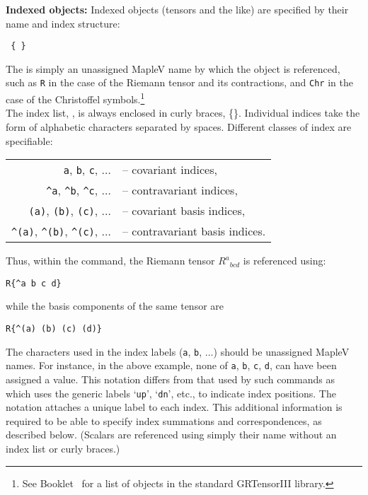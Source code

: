 \documentclass{article}
\begin{document}
\noindent\textbf{Indexed objects:} 
Indexed objects (tensors and the like) are specified by
their name and index structure:
\begin{center}
	\texttt{ \{  \}}
\end{center}
The  is simply an unassigned MapleV name by which the
object is referenced, such as \texttt{R} in the case of the Riemann
tensor and its contractions, and \texttt{Chr} in the case of the
Christoffel symbols.\footnote{See Booklet \grCalcRef~for a list of
objects in the standard GRTensorIII library.}\\

The index list, , is always enclosed in curly braces,
\{\}.  Individual indices take the form of alphabetic characters
separated by spaces. Different classes of index are specifiable:
\begin{center}
  \begin{tabular}{rl}
    \texttt{a}, \texttt{b}, \texttt{c}, $\ldots$ & -- covariant indices,\\
    \texttt{\^{}a}, \texttt{\^{}b}, \texttt{\^{}c}, $\ldots$ & -- contravariant
      indices, \\
    \texttt{(a)}, \texttt{(b)}, \texttt{(c)}, $\ldots$ & -- covariant basis
      indices, \\
    \texttt{\^{}(a)}, \texttt{\^{}(b)}, \texttt{\^{}(c)}, $\ldots$ &
      -- contravariant basis indices.
  \end{tabular}
\end{center}
Thus, within the  command, the Riemann tensor $R^a{}_{bcd}$ is
referenced using:
\begin{center}
  \texttt{R\{\^{}a b c d\} }
\end{center}
while the basis components of the same tensor are
\begin{center}
  \texttt{R\{\^{}(a) (b) (c) (d)\} }
\end{center}
The characters used in the index labels (\texttt{a}, \texttt{b},
$\ldots$) should be unassigned MapleV names. For instance, in the
above example, none of \texttt{a}, \texttt{b}, \texttt{c}, \texttt{d},
can have been assigned a value. This notation differs from that used
by such commands as  which uses the generic labels
`\texttt{up}', `\texttt{dn}', etc., to indicate index positions. The
 notation attaches a unique label to each index. This
additional information is required to be able to specify index
summations and correspondences, as described below. (Scalars are
referenced using simply their name without an index list or curly
braces.)\\
\end{document}
